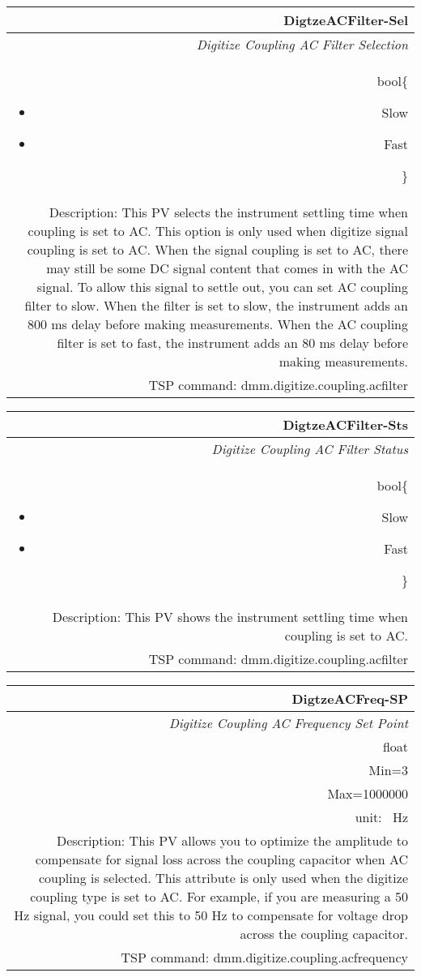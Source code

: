 \documentclass[openany]{article}
\begin{document}
		\begin{tabular}{N}
			\hline
			\bfseries DigtzeACFilter-Sel\label{pv:digtzeacfilter-sel} \\ \hline
			\emph{Digitize Coupling AC Filter Selection} \\
			bool\{\begin{itemize}[noitemsep]
				\small
				\item[] Slow
				\item[] Fast
			\end{itemize}\} \\
			Description: This PV selects the instrument settling time when coupling is set to AC. This option is only used when digitize signal coupling is set to AC. When the signal coupling is set to AC, there may still be some DC signal content that comes in with the AC signal. To allow this signal to settle out, you can set AC coupling filter to slow. When the filter is set to slow, the instrument adds an 800 ms delay before making measurements. When the AC coupling filter is set to fast, the instrument adds an 80 ms delay before making measurements. \\
			TSP command: dmm.digitize.coupling.acfilter
		\end{tabular}

		\begin{tabular}{N}
			\hline
			\bfseries DigtzeACFilter-Sts\label{pv:digtzeacfilter-sts} \\ \hline
			\emph{Digitize Coupling AC Filter Status} \\
			bool\{\begin{itemize}[noitemsep]
				\small
				\item[] Slow
				\item[] Fast
			\end{itemize}\} \\
			Description: This PV shows the instrument settling time when coupling is set to AC. \\
			TSP command: dmm.digitize.coupling.acfilter
		\end{tabular}

		\begin{tabular}{N}
			\hline
			\bfseries DigtzeACFreq-SP\label{pv:digtzeacfreq-sp} \\ \hline
			\emph{Digitize Coupling AC Frequency Set Point} \\
			float \\
			Min=3\\
			Max=1000000 \\
			unit: \SI{}{\hertz} \\
			Description: This PV allows you to optimize the amplitude to compensate for signal loss across the coupling capacitor when AC coupling is selected. This attribute is only used when the digitize coupling type is set to AC. For example, if you are measuring a 50 Hz signal, you could set this to 50 Hz to compensate for voltage drop across the coupling capacitor. \\
			TSP command: dmm.digitize.coupling.acfrequency
		\end{tabular}
\end{document}
